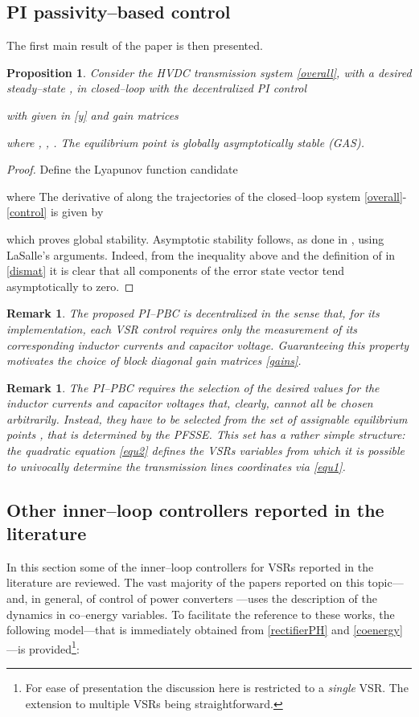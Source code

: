 \documentclass[5p,twocolumn]{elsarticle}
\def\lab{\label}
\def\begrem{\begin{remark}\rm}
\def\endrem{\end{remark}}
\newtheorem{proposition}[theorem]{Proposition}
\newtheorem{remark}[theorem]{Remark}
\numberwithin{equation}{section}
\begin{document}
\subsection{PI passivity--based control}
\label{PBCcontrol}
The first main result of the paper is then presented. \smallbreak
\begin{proposition}\em
\lab{pro2}
Consider the HVDC transmission system \eqref{overall}, with a desired steady--state , in closed--loop with the decentralized PI control

with  given in \eqref{y} and gain matrices

where , , . The equilibrium point  is globally asymptotically stable (GAS).
\end{proposition}
\begin{proof}
Define the Lyapunov function candidate

where 
The derivative of  along the trajectories of the closed--loop system \eqref{overall}-\eqref{control} is given by

which proves global stability. Asymptotic stability follows, as done in \cite{HERetal}, using LaSalle's arguments. Indeed, from the inequality above and the definition of  in \eqref{dismat} it is clear
that all components of the error state vector  tend asymptotically to zero.
\end{proof}


\begrem
The proposed PI--PBC is decentralized in the sense that, for its implementation, each VSR control requires only the measurement of its corresponding inductor currents and capacitor voltage. Guaranteeing this property motivates the choice of block diagonal gain matrices \eqref{gains}.
\endrem

\begrem
The PI--PBC requires the selection of the desired values for the inductor currents and capacitor voltages that, clearly, cannot all be chosen arbitrarily. Instead, they have to be selected from the set of
assignable equilibrium points , that is determined by the {PFSSE}.  This set has a rather simple structure: the quadratic equation \eqref{equ2} defines the VSRs variables from which it is possible to {\em
univocally} determine the transmission lines coordinates via \eqref{equ1}.
\endrem
\subsection{Other inner--loop controllers reported in the literature}
\label{liter}
In this section some of the inner--loop controllers for VSRs reported in the literature are reviewed. The vast majority of the papers reported on this topic---and, in general, of control of power converters
\cite{kazm,pinto}---uses the description of the dynamics in co--energy variables. To facilitate the reference to these works, the following model---that is immediately
obtained from \eqref{rectifierPH} and \eqref{coenergy}---is provided\footnote{For ease of presentation the discussion here is restricted to a {\em single} VSR. The extension to multiple VSRs being straightforward.}:
\end{document}
